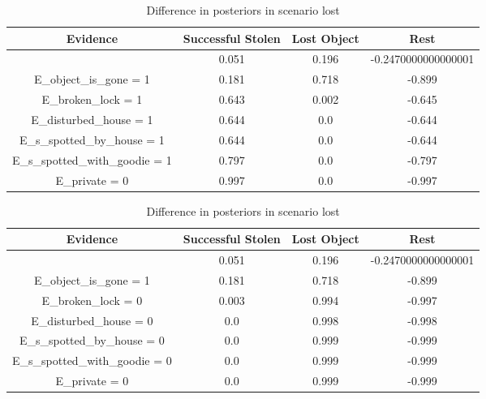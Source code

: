 \begin{table}\begin{tabular}{c|c|c|c}Evidence & Successful Stolen & Lost Object & Rest \\\hline & 0.051 & 0.196 & -0.2470000000000001 \\E\_object\_is\_gone = 1 & 0.181 & 0.718 & -0.899 \\E\_broken\_lock = 1 & 0.643 & 0.002 & -0.645 \\E\_disturbed\_house = 1 & 0.644 & 0.0 & -0.644 \\E\_s\_spotted\_by\_house = 1 & 0.644 & 0.0 & -0.644 \\E\_s\_spotted\_with\_goodie = 1 & 0.797 & 0.0 & -0.797 \\E\_private = 0 & 0.997 & 0.0 & -0.997 \\\end{tabular}\caption{Difference in posteriors in scenario stolen }\begin{tabular}{c|c|c|c}Evidence & Successful Stolen & Lost Object & Rest \\\hline & 0.051 & 0.196 & -0.2470000000000001 \\E\_object\_is\_gone = 1 & 0.181 & 0.718 & -0.899 \\E\_broken\_lock = 0 & 0.003 & 0.994 & -0.997 \\E\_disturbed\_house = 0 & 0.0 & 0.998 & -0.998 \\E\_s\_spotted\_by\_house = 0 & 0.0 & 0.999 & -0.999 \\E\_s\_spotted\_with\_goodie = 0 & 0.0 & 0.999 & -0.999 \\E\_private = 0 & 0.0 & 0.999 & -0.999 \\\end{tabular}\caption{Difference in posteriors in scenario lost }\end{table}